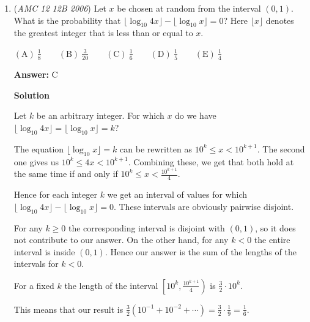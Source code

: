 \begin{enumerate}
 $\textbf{Case 2: a0a0:}$Similarly to Case $1$, we can determine that $a$ has to be $9$. However, the number $9090$ is not divisible by both $4$ and $7$. Using the same logic in case $1$, we conclude that Case $2$ cannot be true.

 Since we have disproven all of our cases, we know that it is impossible for one of the children to be $\mathrm{(B)}\ 5$ years old.

 \textbf{NOTE}: This might look tedious, but it only took me around 30 seconds to do on paper.

 


	\item (\textit{AMC 12 12B 2006}) Let $x$ be chosen at random from the interval $(0,1)$. What is the probability that
$\lfloor\log_{10}4x\rfloor - \lfloor\log_{10}x\rfloor = 0$?
Here $\lfloor x\rfloor$ denotes the greatest integer that is less than or equal to $x$.


 

$\mathrm{(A)}\ \frac 18 \qquad \mathrm{(B)}\ \frac 3{20} \qquad \mathrm{(C)}\ \frac 16 \qquad \mathrm{(D)}\ \frac 15  \qquad \mathrm{(E)}\ \frac 14$

 \textbf{Answer: }C



\textbf{Solution}

Let $k$ be an arbitrary integer. For which $x$ do we have $\lfloor\log_{10}4x\rfloor = \lfloor\log_{10}x\rfloor = k$?

 The equation $\lfloor\log_{10}x\rfloor = k$ can be rewritten as $10^k \leq x < 10^{k+1}$. The second one gives us $10^k \leq 4x < 10^{k+1}$. Combining these, we get that both hold at the same time if and only if $10^k \leq x < \frac{10^{k+1}}4$.

 Hence for each integer $k$ we get an interval of values for which $\lfloor\log_{10}4x\rfloor - \lfloor\log_{10}x\rfloor = 0$. These intervals are obviously pairwise disjoint.

 For any $k\geq 0$ the corresponding interval is disjoint with $(0,1)$, so it does not contribute to our answer. On the other hand, for any $k<0$ the entire interval is inside $(0,1)$. Hence our answer is the sum of the lengths of the intervals for $k<0$.

 For a fixed $k$ the length of the interval $\left[ 10^k, \frac{10^{k+1}}4 \right)$ is $\frac 32\cdot 10^k$. 

 This means that our result is $\frac 32 \left( 10^{-1} + 10^{-2} + \cdots \right) = \frac 32 \cdot \frac 19 = \boxed{\frac 16}$.


\end{enumerate}
